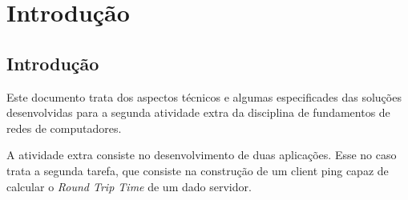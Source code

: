 \chapter[Introdução]{Introdução}

\section{Introdução}

    Este documento trata dos aspectos técnicos e algumas especificades das
    soluções desenvolvidas para a segunda atividade extra da disciplina de
    fundamentos de redes de computadores.

    A atividade extra consiste no desenvolvimento de duas aplicações. Esse no
    caso trata a segunda tarefa, que consiste na construção de um client ping
    capaz de calcular o \textit{Round Trip Time} de um dado servidor.
